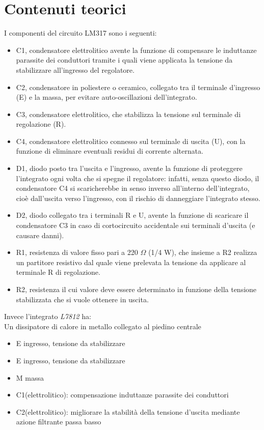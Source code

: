 \documentclass[12pt]{article}
\begin{document}
    \section{Contenuti teorici}
    I componenti del circuito LM317 sono i seguenti:\\
    \begin{itemize}
        \item C1, condensatore elettrolitico avente la funzione di compensare le induttanze parassite dei conduttori
        tramite i quali viene applicata la tensione da stabilizzare all’ingresso del regolatore.
        \item C2, condensatore in poliestere o ceramico, collegato tra il terminale d’ingresso (E) e la massa, per 
        evitare auto-oscillazioni dell’integrato.
        \item C3, condensatore elettrolitico, che stabilizza la tensione sul terminale di regolazione (R).
        \item C4, condensatore elettrolitico connesso sul terminale di uscita (U), con la funzione di eliminare eventuali
        residui di corrente alternata.
        \item D1, diodo posto tra l’uscita e l’ingresso, avente la funzione di proteggere l’integrato ogni volta che si 
        spegne il regolatore: infatti, senza questo diodo, il condensatore C4 si scaricherebbe in senso inverso all’interno
        dell’integrato, cioè dall’uscita verso l’ingresso, con il rischio di danneggiare l’integrato stesso.
        \item D2, diodo collegato tra i terminali R e U, avente la funzione di scaricare il condensatore C3 in caso di 
        cortocircuito accidentale sui terminali d’uscita (e causare danni).
        \item R1, resistenza di valore fisso pari a 220 $\Omega$ (1/4 W), che insieme a R2 realizza un partitore resistivo dal quale viene
        prelevata la tensione da applicare al terminale R di regolazione.
        \item R2, resistenza il cui valore deve essere determinato in funzione della tensione stabilizzata che si vuole ottenere in
        uscita.\\
    \end{itemize}  

    \noindent

    Invece l'integrato \textit{L7812} ha:\\
    Un dissipatore di calore in metallo collegato al piedino centrale
    \begin{itemize}
        \item E ingresso, tensione da stabilizzare
        \item E ingresso, tensione da stabilizzare
        \item M massa
        \item C1(elettrolitico): compensazione induttanze parassite dei conduttori
        \item C2(elettrolitico): migliorare la stabilità della tensione d’uscita mediante azione filtrante passa basso
    \end{itemize}
\end{document}
